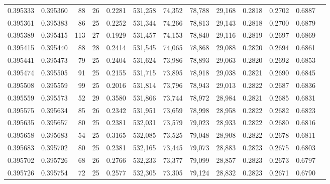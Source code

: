 \begin{tabular}{rrrrrrrrrrrrr}
0.395333 & 0.395360 &    88 &  26 &                                     0.2281 & 531,258 &  74,352 &  78,788 &  29,168 & 0.2818 & 0.2702 & 0.6887 \\
0.395361 & 0.395383 &    86 &  25 &                                     0.2252 & 531,344 &  74,266 &  78,813 &  29,143 & 0.2818 & 0.2700 & 0.6879 \\
0.395389 & 0.395415 &   113 &  27 &                                     0.1929 & 531,457 &  74,153 &  78,840 &  29,116 & 0.2819 & 0.2697 & 0.6869 \\
0.395415 & 0.395440 &    88 &  28 &                                     0.2414 & 531,545 &  74,065 &  78,868 &  29,088 & 0.2820 & 0.2694 & 0.6861 \\
0.395441 & 0.395473 &    79 &  25 &                                     0.2404 & 531,624 &  73,986 &  78,893 &  29,063 & 0.2820 & 0.2692 & 0.6853 \\
0.395474 & 0.395505 &    91 &  25 &                                     0.2155 & 531,715 &  73,895 &  78,918 &  29,038 & 0.2821 & 0.2690 & 0.6845 \\
0.395508 & 0.395559 &    99 &  25 &                                     0.2016 & 531,814 &  73,796 &  78,943 &  29,013 & 0.2822 & 0.2687 & 0.6836 \\
0.395559 & 0.395573 &    52 &  29 &                                     0.3580 & 531,866 &  73,744 &  78,972 &  28,984 & 0.2821 & 0.2685 & 0.6831 \\
0.395575 & 0.395634 &    85 &  26 &                                     0.2342 & 531,951 &  73,659 &  78,998 &  28,958 & 0.2822 & 0.2682 & 0.6823 \\
0.395635 & 0.395657 &    80 &  25 &                                     0.2381 & 532,031 &  73,579 &  79,023 &  28,933 & 0.2822 & 0.2680 & 0.6816 \\
0.395658 & 0.395683 &    54 &  25 &                                     0.3165 & 532,085 &  73,525 &  79,048 &  28,908 & 0.2822 & 0.2678 & 0.6811 \\
0.395683 & 0.395702 &    80 &  25 &                                     0.2381 & 532,165 &  73,445 &  79,073 &  28,883 & 0.2823 & 0.2675 & 0.6803 \\
0.395702 & 0.395726 &    68 &  26 &                                     0.2766 & 532,233 &  73,377 &  79,099 &  28,857 & 0.2823 & 0.2673 & 0.6797 \\
0.395726 & 0.395754 &    72 &  25 &                                     0.2577 & 532,305 &  73,305 &  79,124 &  28,832 & 0.2823 & 0.2671 & 0.6790 \\

\end{tabular}

